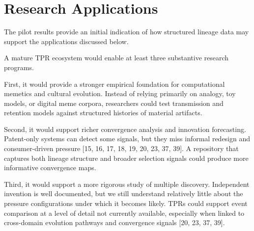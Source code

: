 \section{Research Applications}

The pilot results provide an initial indication of how structured lineage data may support the applications discussed below.

A mature TPR ecosystem would enable at least three substantive research programs.

First, it would provide a stronger empirical foundation for computational memetics and cultural evolution. Instead of relying primarily on analogy, toy models, or digital meme corpora, researchers could test transmission and retention models against structured histories of material artifacts.

Second, it would support richer convergence analysis and innovation forecasting. Patent-only systems can detect some signals, but they miss informal redesign and consumer-driven pressure [15, 16, 17, 18, 19, 20, 23, 37, 39]. A repository that captures both lineage structure and broader selection signals could produce more informative convergence maps.

Third, it would support a more rigorous study of multiple discovery. Independent invention is well documented, but we still understand relatively little about the pressure configurations under which it becomes likely. TPRs could support event comparison at a level of detail not currently available, especially when linked to cross-domain evolution pathways and convergence signals [20, 23, 37, 39].
